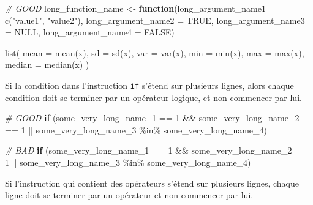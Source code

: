 \documentclass[
  french,
]{scrbook}
\newenvironment{Shaded}{\begin{snugshade}}{\end{snugshade}}
\newcommand{\AttributeTok}[1]{\textcolor[rgb]{0.77,0.63,0.00}{#1}}
\newcommand{\CommentTok}[1]{\textcolor[rgb]{0.56,0.35,0.01}{\textit{#1}}}
\newcommand{\ConstantTok}[1]{\textcolor[rgb]{0.00,0.00,0.00}{#1}}
\newcommand{\ControlFlowTok}[1]{\textcolor[rgb]{0.13,0.29,0.53}{\textbf{#1}}}
\newcommand{\DecValTok}[1]{\textcolor[rgb]{0.00,0.00,0.81}{#1}}
\newcommand{\FunctionTok}[1]{\textcolor[rgb]{0.00,0.00,0.00}{#1}}
\newcommand{\NormalTok}[1]{#1}
\newcommand{\OtherTok}[1]{\textcolor[rgb]{0.56,0.35,0.01}{#1}}
\newcommand{\SpecialCharTok}[1]{\textcolor[rgb]{0.00,0.00,0.00}{#1}}
\newcommand{\StringTok}[1]{\textcolor[rgb]{0.31,0.60,0.02}{#1}}
\begin{document}
\begin{Shaded}
\begin{Highlighting}[]
\CommentTok{\# GOOD}
\NormalTok{long\_function\_name }\OtherTok{\textless{}{-}} \ControlFlowTok{function}\NormalTok{(}\AttributeTok{long\_argument\_name1 =} \FunctionTok{c}\NormalTok{(}\StringTok{"value1"}\NormalTok{, }\StringTok{"value2"}\NormalTok{),}
                               \AttributeTok{long\_argument\_name2 =} \ConstantTok{TRUE}\NormalTok{,}
                               \AttributeTok{long\_argument\_name3 =} \ConstantTok{NULL}\NormalTok{,}
                               \AttributeTok{long\_argument\_name4 =} \ConstantTok{FALSE}\NormalTok{)}
  
\FunctionTok{list}\NormalTok{(}
  \AttributeTok{mean =} \FunctionTok{mean}\NormalTok{(x),}
  \AttributeTok{sd =} \FunctionTok{sd}\NormalTok{(x),}
  \AttributeTok{var =} \FunctionTok{var}\NormalTok{(x),}
  \AttributeTok{min =} \FunctionTok{min}\NormalTok{(x),}
  \AttributeTok{max =} \FunctionTok{max}\NormalTok{(x),}
  \AttributeTok{median =} \FunctionTok{median}\NormalTok{(x)}
\NormalTok{)}
\end{Highlighting}
\end{Shaded}

Si la condition dans l'instruction \texttt{if} s'étend sur plusieurs lignes, alors chaque condition doit se terminer par un opérateur logique, et non commencer par lui.

\begin{Shaded}
\begin{Highlighting}[]
\CommentTok{\# GOOD}
\ControlFlowTok{if}\NormalTok{ (some\_very\_long\_name\_1 }\SpecialCharTok{==} \DecValTok{1} \SpecialCharTok{\&\&}
\NormalTok{    some\_very\_long\_name\_2 }\SpecialCharTok{==} \DecValTok{1} \SpecialCharTok{||}
\NormalTok{    some\_very\_long\_name\_3 }\SpecialCharTok{\%in\%}\NormalTok{ some\_very\_long\_name\_4)}
  
\CommentTok{\# BAD}
\ControlFlowTok{if}\NormalTok{ (some\_very\_long\_name\_1 }\SpecialCharTok{==} \DecValTok{1}
    \SpecialCharTok{\&\&}\NormalTok{ some\_very\_long\_name\_2 }\SpecialCharTok{==} \DecValTok{1}
    \SpecialCharTok{||}\NormalTok{ some\_very\_long\_name\_3 }\SpecialCharTok{\%in\%}\NormalTok{ some\_very\_long\_name\_4)}
\end{Highlighting}
\end{Shaded}

Si l'instruction qui contient des opérateurs s'étend sur plusieurs lignes, chaque ligne doit se terminer par un opérateur et non commencer par lui.
\end{document}
